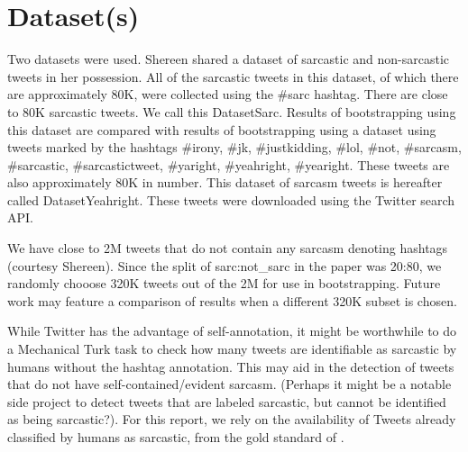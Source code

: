 \documentclass[11pt]{article}
\begin{document}
 
\section{Dataset(s)}

Two datasets were used. Shereen shared a dataset of sarcastic and non-sarcastic tweets in her possession. All of the sarcastic tweets in this dataset, of which there are approximately 80K, were collected using the \#sarc hashtag. There are close to 80K sarcastic tweets. We call this DatasetSarc. Results of bootstrapping using this dataset are compared with results of bootstrapping using a dataset using tweets marked by the hashtags \#irony, \#jk, \#justkidding, \#lol, \#not, \#sarcasm, \#sarcastic, \#sarcastictweet, \#yaright, \#yeahright, \#yearight. These tweets are also approximately 80K in number. This dataset of sarcasm tweets is hereafter called DatasetYeahright. These tweets were downloaded using the Twitter search API.

We have close to 2M tweets that do not contain any sarcasm denoting hashtags (courtesy Shereen). Since the split of sarc:not\_sarc in the \cite{riloff2013sarcasm} paper was 20:80, we randomly chooose 320K tweets out of the 2M for use in bootstrapping. Future work may feature a comparison of results when a different 320K subset is chosen.


While Twitter has the advantage of self-annotation, it might be worthwhile to do a Mechanical Turk task to check how many tweets are identifiable as sarcastic by humans without the hashtag annotation. This may aid in the detection of tweets that do not have self-contained/evident sarcasm. (Perhaps it might be a notable side project to detect tweets that are labeled sarcastic, but cannot be identified as being sarcastic?). For this report, we rely on the availability of Tweets already classified by humans as sarcastic, from the gold standard of \cite{riloff2013sarcasm}.
\end{document}
